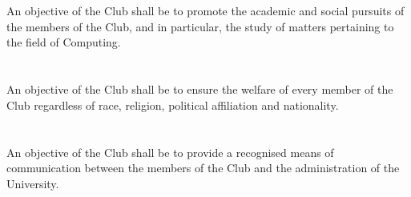 
\section{}
An objective of the Club shall be to promote the academic and social pursuits of the members of the Club, and in particular, the study of matters pertaining to the field of Computing.

\section{}
An objective of the Club shall be to ensure the welfare of every member of the Club regardless of race, religion, political affiliation and nationality.

\section{}
An objective of the Club shall be to provide a recognised means of communication between the members of the Club and the administration of the University.
